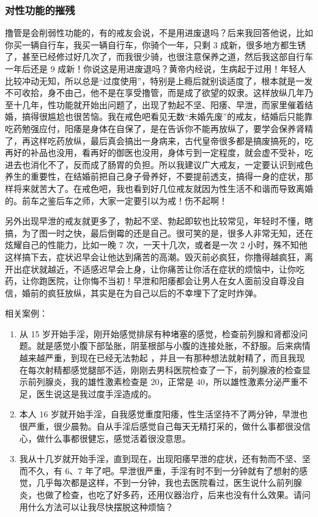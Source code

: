 \documentclass{ctexart}
\begin{document}
\subsubsection{对性功能的摧残}

撸管是会削弱性功能的，有的戒友会说，不是用进废退吗？后来我回答他说，比如你买一辆自行车，我买一辆自行车，你骑个一年，只剩 3 成新，很多地方都生锈了，甚至已经修过好几次了，而我很少骑，也很注意保养之道，然后我这部自行车一年后还是 9 成新！你说这是用进废退吗？黄帝内经说，生病起于过用！年轻人比较冲动无知，所以总是“过度使用”，特别是上瘾后就别谈适度了，根本就是一发不可收拾，身不由己，他不是在享受撸管，而是成了欲望的奴隶。这样放纵几年乃至十几年，性功能就开始出问题了，出现了勃起不坚、阳痿、早泄，而家里催着结婚，搞得很尴尬也很苦恼。我在戒色吧看见无数“未婚先废”的戒友，结婚后只能靠吃药勉强应付，阳痿是身体在自保了，是在告诉你不能再放纵了，要学会保养肾精了，再这样吃药放纵，最后真会搞出一身病来，古代皇帝很多都是搞废搞死的，吃再好的补品也没用，看再好的御医也没用，身体亏到一定程度，就会虚不受补，吃进去也消化不了，反而成了肠胃的负担。所以我建议广大戒友，一定要认识到戒色养生的重要性，在结婚前把自己身子骨养好，不要提前透支，搞得一身的症状，那样将来就苦大了。在戒色吧，我也看到好几位戒友就因为性生活不和谐而导致离婚的。前车之鉴后车之师，大家一定要引以为戒！伤不起啊！

另外出现早泄的戒友就更多了，勃起不坚、勃起即软也比较常见，年轻时不懂，瞎搞，为了图一时之快，最后倒霉的还是自己。很可笑的是，很多人非常无知，还在炫耀自己的性能力，比如一晚 7 次，一天十几次，或者是一次 2 小时，殊不知他这样搞下去，症状迟早会让他达到痛苦的高潮。毁灭前必疯狂，你撸得越疯狂，离开出症状就越近，不适感迟早会上身，让你痛苦让你活在症状的烦恼中，让你吃药，让你跑医院，让你悔不当初！早泄和阳痿都会让男人在女人面前没自尊没自信，婚前的疯狂放纵，其实是在为自己以后的不幸埋下了定时炸弹。

相关案例：

\begin{enumerate}
    \item 从 15 岁开始手淫，刚开始感觉排尿有种堵塞的感觉，检查前列腺和肾都没问题。就是感觉小腹下部坠胀，阴茎根部与小腹的连接处胀，不舒服。后来病情越来越严重，到现在已经无法勃起 ，并且一有那种想法就射精了，而且我现在每次射精都感觉腿部不适，刚刚去男科医院检查了一下，前列腺液的检查显示前列腺炎，我的雄性激素检查是 20，正常是 40，所以雄性激素分泌严重不足，医生说这是我过度手淫造成的。
    \item 本人 16 岁就开始手淫，自我感觉重度阳痿，性生活坚持不了两分钟，早泄也很严重，很少晨勃。自从手淫后感觉自己每天无精打采的，做什么事都很没信心，做什么事都很健忘，感觉活着很没意思。
    \item 我从十几岁就开始手淫，直到现在，出现阳痿早泄的症状，还有勃而不坚、坚而不久，有 6、7 年了吧。早泄很严重，手淫有时不到一分钟就有了想射的感觉，几乎每次都是这样，不到一分钟，我也去医院看过，医生说什么前列腺炎，也做了检查，也吃了好多药，还用仪器治疗，后来也没有什么效果。请问用什么方法可以让我尽快摆脱这种烦恼？
\end{enumerate}
\end{document}
